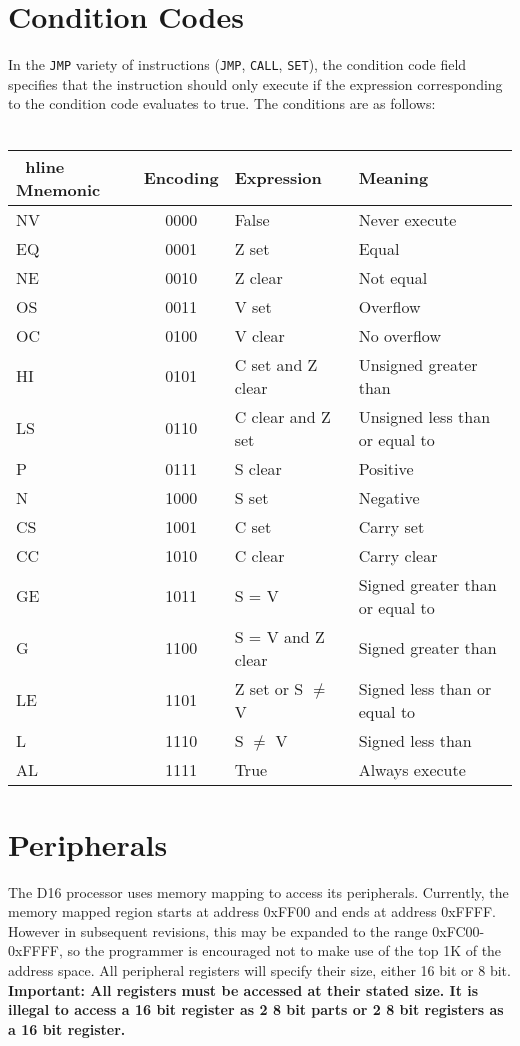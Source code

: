 \documentclass{article}
\begin{document}
        \section{Condition Codes}
        In the \texttt{JMP} variety of instructions (\texttt{JMP}, \texttt{CALL}, \texttt{SET}), the condition code field specifies that the instruction should only execute if the expression corresponding to the condition code evaluates to true. The conditions are as follows: \\ \\
        \begin{tabular}{| l | c | l | l |} \
          hline
        Mnemonic & Encoding & Expression & Meaning \\ \hline
        NV &0000& False & Never execute\\ \hline
        EQ &0001& Z set & Equal\\ \hline
        NE &0010& Z clear & Not equal \\ \hline
        OS &0011& V set & Overflow \\ \hline
        OC &0100& V clear & No overflow \\ \hline
        HI &0101& C set and Z clear & Unsigned greater than \\ \hline
        LS &0110& C clear and Z set & Unsigned less than or equal to \\ \hline
        P  &0111& S clear & Positive \\ \hline
        N  &1000& S set & Negative \\ \hline
        CS &1001& C set & Carry set \\ \hline
        CC &1010& C clear & Carry clear \\ \hline
        GE &1011& S = V & Signed greater than or equal to\\ \hline
        G  &1100& S = V and Z clear & Signed greater than \\ \hline
        LE &1101& Z set or S $\neq$ V & Signed less than or equal to \\ \hline
        L  &1110& S $\neq$ V & Signed less than \\ \hline
        AL &1111& True & Always execute \\ \hline
        \end{tabular}
        \newpage
        \section{Peripherals}
        The D16 processor uses memory mapping to access its peripherals. Currently, the memory mapped region starts at address 0xFF00 and ends at address 0xFFFF. However in subsequent revisions, this may be expanded to the range 0xFC00-0xFFFF, so the programmer is encouraged not to make use of the top 1K of the address space.
        All peripheral registers will specify their size, either 16 bit or 8 bit. \textbf{Important: All registers must be accessed at their stated size. It is illegal to access a 16 bit register as 2 8 bit parts or 2 8 bit registers as a 16 bit register.}
\end{document}
